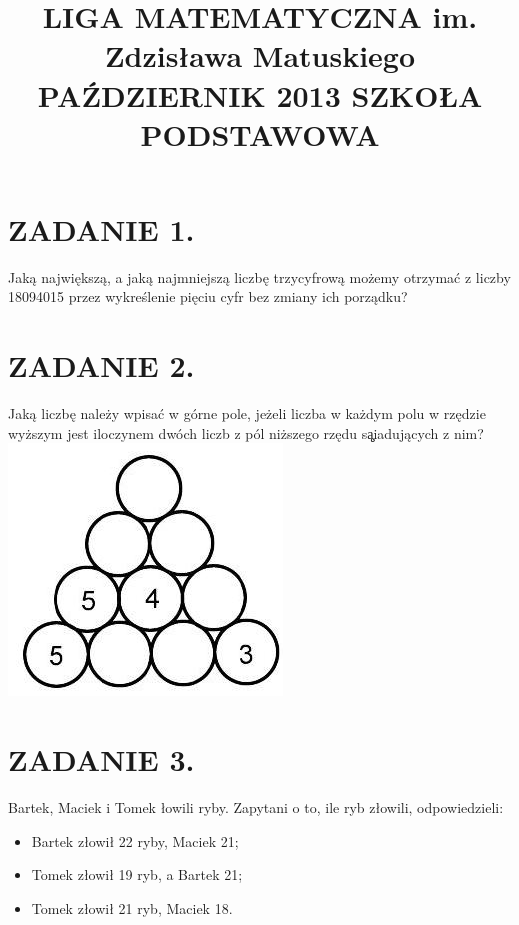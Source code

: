 \documentclass[10pt]{article}
\title{LIGA MATEMATYCZNA im. Zdzisława Matuskiego \\
 PAŹDZIERNIK 2013 SZKOŁA PODSTAWOWA }
\author{}
\date{}
\begin{document}
\maketitle
\section*{ZADANIE 1.}
Jaką największą, a jaką najmniejszą liczbę trzycyfrową możemy otrzymać z liczby 18094015 przez wykreślenie pięciu cyfr bez zmiany ich porządku?

\section*{ZADANIE 2.}
Jaką liczbę należy wpisać w górne pole, jeżeli liczba w każdym polu w rzędzie wyższym jest iloczynem dwóch liczb z pól niższego rzędu są̧iadujących z nim?\\
\includegraphics[max width=\textwidth, center]{2024_11_21_67b4ce0009b19a2ea4b2g-1}

\section*{ZADANIE 3.}
Bartek, Maciek i Tomek łowili ryby. Zapytani o to, ile ryb złowili, odpowiedzieli:

\begin{itemize}
  \item Bartek złowił 22 ryby, Maciek 21;
  \item Tomek złowił 19 ryb, a Bartek 21;
  \item Tomek złowił 21 ryb, Maciek 18.
\end{itemize}
\end{document}
